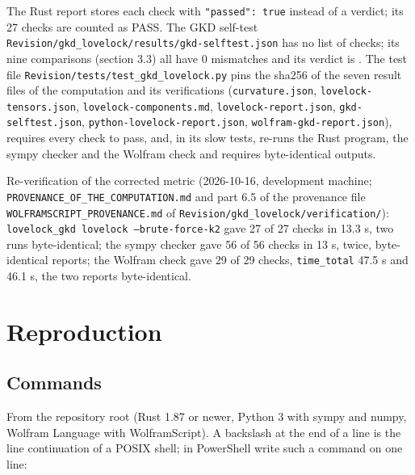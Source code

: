 \documentclass[11pt]{article}
\begin{document}
The Rust report stores each check with \texttt{"passed"\allowbreak{}: true} instead of a verdict; its 27 checks are counted as PASS. The GKD self-test \texttt{Revision\allowbreak{}/gkd\_lov\allowbreak{}elock/re\allowbreak{}sults/gk\allowbreak{}d-selfte\allowbreak{}st.json} has no list of checks; its nine comparisons (section 3.3) all have 0 mismatches and its verdict is \texttt{}. The test file \texttt{Revision\allowbreak{}/tests/t\allowbreak{}est\_gkd\_\allowbreak{}lovelock\allowbreak{}.py} pins the sha256 of the seven result files of the computation and its verifications (\texttt{curvatur\allowbreak{}e.json}, \texttt{lovelock\allowbreak{}-tensors\allowbreak{}.json}, \texttt{lovelock\allowbreak{}-compone\allowbreak{}nts.md}, \texttt{lovelock\allowbreak{}-report.\allowbreak{}json}, \texttt{gkd-self\allowbreak{}test.jso\allowbreak{}n}, \texttt{python-l\allowbreak{}ovelock-\allowbreak{}report.j\allowbreak{}son}, \texttt{wolfram-\allowbreak{}gkd-repo\allowbreak{}rt.json}), requires every check to pass, and, in its slow tests, re-runs the Rust program, the sympy checker and the Wolfram check and requires byte-identical outputs.

Re-verification of the corrected metric (2026-10-16, development machine; \texttt{PROVENAN\allowbreak{}CE\_OF\_TH\allowbreak{}E\_COMPUT\allowbreak{}ATION.md} and part 6.5 of the provenance file \texttt{WOLFRAMS\allowbreak{}CRIPT\_PR\allowbreak{}OVENANCE\allowbreak{}.md} of \texttt{Revision\allowbreak{}/gkd\_lov\allowbreak{}elock/ve\allowbreak{}rificati\allowbreak{}on/}): \texttt{lovelock\allowbreak{}\_gkd lov\allowbreak{}elock --\allowbreak{}brute-fo\allowbreak{}rce-k2} gave 27 of 27 checks in 13.3 s, two runs byte-identical; the sympy checker gave 56 of 56 checks in 13 s, twice, byte-identical reports; the Wolfram check gave 29 of 29 checks, \texttt{time\_tot\allowbreak{}al} 47.5 s and 46.1 s, the two reports byte-identical.

\section{Reproduction}

\subsection{Commands}

From the repository root (Rust 1.87 or newer, Python 3 with sympy and numpy, Wolfram Language with WolframScript). A backslash at the end of a line is the line continuation of a POSIX shell; in PowerShell write such a command on one line:
\end{document}
